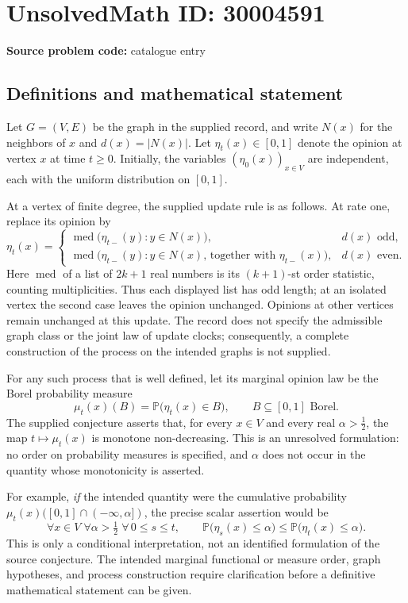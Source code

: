 \documentclass[11pt]{article}
\begin{document}
\section*{UnsolvedMath ID: 30004591}
\textbf{Source problem code:} catalogue entry
\subsection{Definitions and mathematical statement}
Let \(G=(V,E)\) be the graph in the supplied record, and write \(N(x)\) for the neighbors of \(x\) and \(d(x)=|N(x)|\). Let \(\eta_t(x)\in[0,1]\) denote the opinion at vertex \(x\) at time \(t\geq0\). Initially, the variables \((\eta_0(x))_{x\in V}\) are independent, each with the uniform distribution on \([0,1]\).

At a vertex of finite degree, the supplied update rule is as follows. At rate one, replace its opinion by
\[
\eta_t(x)=
\begin{cases}
\operatorname{med}\bigl(\eta_{t-}(y):y\in N(x)\bigr),&d(x)\text{ odd},\\
\operatorname{med}\bigl(\eta_{t-}(y):y\in N(x)\text{, together with }\eta_{t-}(x)\bigr),&d(x)\text{ even}.
\end{cases}
\]
Here \(\operatorname{med}\) of a list of \(2k+1\) real numbers is its \((k+1)\)-st order statistic, counting multiplicities. Thus each displayed list has odd length; at an isolated vertex the second case leaves the opinion unchanged. Opinions at other vertices remain unchanged at this update. The record does not specify the admissible graph class or the joint law of update clocks; consequently, a complete construction of the process on the intended graphs is not supplied.

For any such process that is well defined, let its marginal opinion law be the Borel probability measure
\[
\mu_t(x)(B)=\mathbb{P}\bigl(\eta_t(x)\in B\bigr),\qquad B\subseteq[0,1]\text{ Borel}.
\]
The supplied conjecture asserts that, for every \(x\in V\) and every real \(\alpha>\tfrac12\), the map \(t\mapsto\mu_t(x)\) is monotone non-decreasing. This is an unresolved formulation: no order on probability measures is specified, and \(\alpha\) does not occur in the quantity whose monotonicity is asserted.

For example, \emph{if} the intended quantity were the cumulative probability \(\mu_t(x)([0,1]\cap(-\infty,\alpha])\), the precise scalar assertion would be
\[
\forall x\in V\;\forall\alpha>\tfrac12\;\forall\,0\leq s\leq t,
\qquad
\mathbb{P}\bigl(\eta_s(x)\leq\alpha\bigr)
\leq
\mathbb{P}\bigl(\eta_t(x)\leq\alpha\bigr).
\]
This is only a conditional interpretation, not an identified formulation of the source conjecture. The intended marginal functional or measure order, graph hypotheses, and process construction require clarification before a definitive mathematical statement can be given.
\end{document}
